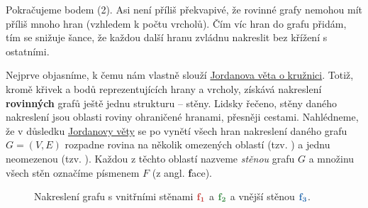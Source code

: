 Pokračujeme bodem (2). Asi není příliš překvapivé, že rovinné grafy nemohou mít
příliš mnoho hran (vzhledem k počtu vrcholů). Čím víc hran do grafu přidám, tím
se snižuje šance, že každou další hranu zvládnu nakreslit bez křížení s
ostatními.

Nejprve objasníme, k čemu nám vlastně slouží
\hyperref[thm:jordanova-o-kruznici]{Jordanova věta o kružnici}. Totiž, kromě
křivek a bodů reprezentujících hrany a vrcholy, získává nakreslení
\textbf{rovinných} grafů ještě jednu strukturu -- stěny. Lidsky řečeno, stěny
daného nakreslení jsou oblasti roviny ohraničené hranami, přesněji cestami.
Nahlédneme, že v důsledku \hyperref[thm:jordanova-o-kruznici]{Jordanovy věty} se
po vynětí všech hran nakreslení daného grafu $G = (V,E)$ rozpadne rovina na
několik omezených oblastí (tzv. ) a jednu neomezenou (tzv.
). Každou z těchto oblastí nazveme \emph{stěnou} grafu $G$ a
množinu všech stěn označíme písmenem $F$ (z angl. \textbf{f}ace).

\begin{figure}[h]
 \centering

 \caption{Nakreslení grafu s vnitřními stěnami $\mathbf{\clr{f_1}}$ a
  $\mathbf{\clg{f_2}}$ a vnější stěnou $\mathbf{\clb{f_3}}$.}
 \label{fig:steny-nakresleni}
\end{figure}

